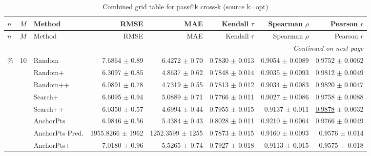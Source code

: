\footnotesize
\setlength{\tabcolsep}{2pt}
\renewcommand{\arraystretch}{1.05}
\setlength{\LTpre}{0pt}
\setlength{\LTpost}{0pt}
\setlength{\LTleft}{\fill}
\setlength{\LTright}{\fill}
\begin{longtable}{llp{}rrrrr}
\caption{Combined grid table for pass@k cross-k (source k=opt)}\label{tab:combined\_grid\_passk\_kopt}\\
\toprule
$n$ & $M$ & Method & RMSE & MAE & Kendall $\tau$ & Spearman $\rho$ & Pearson $r$ \\
\midrule
\endfirsthead
\toprule
$n$ & $M$ & Method & RMSE & MAE & Kendall $\tau$ & Spearman $\rho$ & Pearson $r$ \\
\midrule
\endhead
\midrule
\multicolumn{8}{r}{\emph{Continued on next page}} \\
\midrule
\endfoot
\bottomrule
\endlastfoot
5\% & 10 & Random & 7.6864 {\scriptsize $\pm$ 0.89} & 6.4272 {\scriptsize $\pm$ 0.70} & 0.7830 {\scriptsize $\pm$ 0.013} & 0.9054 {\scriptsize $\pm$ 0.0089} & 0.9752 {\scriptsize $\pm$ 0.0062} \\
 &  & Random+ & 6.3097 {\scriptsize $\pm$ 0.85} & 4.8637 {\scriptsize $\pm$ 0.62} & 0.7848 {\scriptsize $\pm$ 0.014} & 0.9035 {\scriptsize $\pm$ 0.0093} & 0.9812 {\scriptsize $\pm$ 0.0049} \\
 &  & Random++ & 6.0891 {\scriptsize $\pm$ 0.78} & 4.7319 {\scriptsize $\pm$ 0.55} & 0.7813 {\scriptsize $\pm$ 0.012} & 0.9034 {\scriptsize $\pm$ 0.0083} & 0.9820 {\scriptsize $\pm$ 0.0047} \\
 &  & Search+ & 6.6095 {\scriptsize $\pm$ 0.94} & 5.0889 {\scriptsize $\pm$ 0.71} & 0.7766 {\scriptsize $\pm$ 0.011} & 0.9027 {\scriptsize $\pm$ 0.0086} & 0.9758 {\scriptsize $\pm$ 0.0088} \\
 &  & Search++ & 6.0350 {\scriptsize $\pm$ 0.57} & 4.6994 {\scriptsize $\pm$ 0.44} & 0.7955 {\scriptsize $\pm$ 0.015} & 0.9137 {\scriptsize $\pm$ 0.011} & \underline{0.9878} {\scriptsize $\pm$ 0.0032} \\
 &  & AnchorPts & 6.9846 {\scriptsize $\pm$ 0.56} & 5.4384 {\scriptsize $\pm$ 0.43} & 0.8028 {\scriptsize $\pm$ 0.011} & 0.9210 {\scriptsize $\pm$ 0.0064} & 0.9766 {\scriptsize $\pm$ 0.0049} \\
 &  & AnchorPts Pred. & 1955.8266 {\scriptsize $\pm$ 1962} & 1252.3599 {\scriptsize $\pm$ 1255} & 0.7873 {\scriptsize $\pm$ 0.015} & 0.9160 {\scriptsize $\pm$ 0.0093} & 0.9576 {\scriptsize $\pm$ 0.014} \\
 &  & AnchorPts+ & 7.0180 {\scriptsize $\pm$ 0.96} & 5.5265 {\scriptsize $\pm$ 0.74} & 0.7927 {\scriptsize $\pm$ 0.018} & 0.9113 {\scriptsize $\pm$ 0.015} & 0.9575 {\scriptsize $\pm$ 0.018} \\

\end{longtable}
